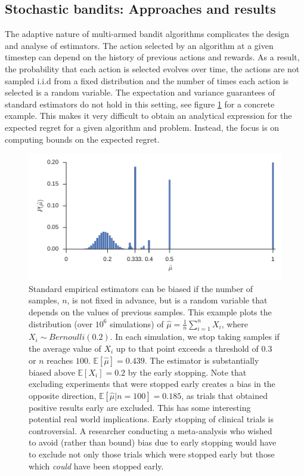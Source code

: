 \documentclass[11pt,a4paper,oneside]{book}
\newcommand{\E}[1]{\mathbb E\left[{#1}\right]}
\theoremstyle{plain}
\theoremstyle{definition}
\begin{document}
\subsection{Stochastic bandits: Approaches and results}

The adaptive nature of multi-armed bandit algorithms complicates the design and analyse of estimators. The action selected by an algorithm at a given timestep can depend on the history of previous actions and rewards. As a result, the probability that each action is selected evolves over time, the actions are not sampled i.i.d from a fixed distribution and the number of times each action is selected is a random variable. The expectation and variance guarantees of standard estimators do not hold in this setting, see figure \ref{fig:early_stopping} for a concrete example. This makes it very difficult to  obtain an analytical expression for the expected regret for a given algorithm and problem. Instead, the focus is on computing bounds on the expected regret. 

\begin{figure}[h]
\centering
\includegraphics[scale=1]{extreme_early_stopping}
\caption{Standard empirical estimators can be biased if the number of samples, $n$, is not fixed in advance, but is a random variable that depends on the values of previous samples. This example plots the distribution (over $10^6$ simulations) of $\hat{\mu} = \frac{1}{n}\sum_{i=1}^n X_i$, where $X_i \sim Bernoulli(0.2)$. In each simulation, we stop taking samples if the average value of $X_i$ up to that point exceeds a threshold of $0.3$ or $n$ reaches $100$. $\E{\hat{\mu}} = 0.439$. The estimator is substantially biased above $\E{X_i} = 0.2$ by the early stopping. Note that excluding experiments that were stopped early creates a bias in the opposite direction, $\E{\hat{\mu}|n=100} = 0.185$, as trials that obtained positive results early are excluded. This has some interesting potential real world implications. Early stopping of clinical trials is controversial. A researcher conducting a meta-analysis who wished to avoid (rather than bound) bias due to early stopping would have to exclude not only those trials which were stopped early but those which \emph{could} have been stopped early.}
\label{fig:early_stopping}
\end{figure}
\end{document}
